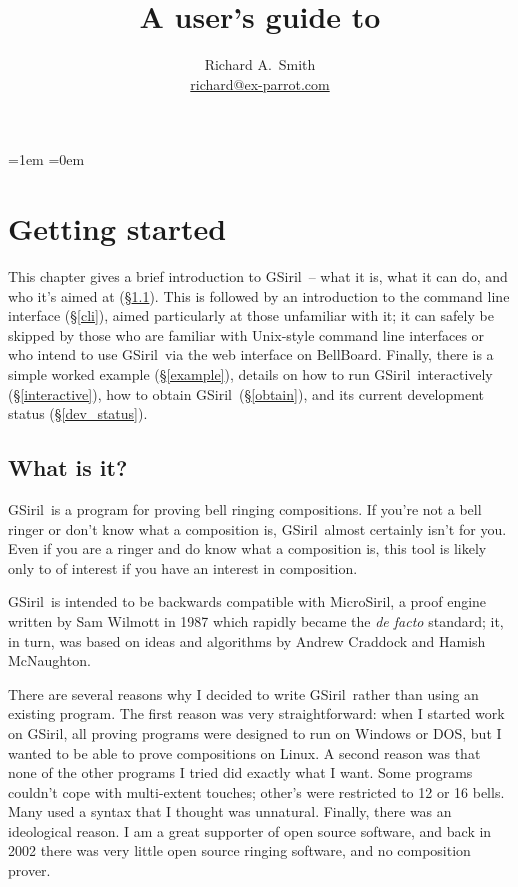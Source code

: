 \documentclass[a4paper,11pt,oneside]{book}
\title{A user's guide to \gsiril}
\author{Richard A.\ Smith\\\url{richard@ex-parrot.com}}
\def\gsiril{GSiril}
\newcommand{\sref}[1]{\hyperref[#1]{\S\ref{#1}}}
\begin{document}
\frontmatter
\maketitle

\clearpage
{}
{}
\tableofcontents
\parskip=1em
\parindent=0em
\addtolength{\footnotesep}{4pt}

\mainmatter

\chapter{Getting started}

This chapter gives a brief introduction to \gsiril\ -- what it is,
what it can do, and who it's aimed at (\sref{what_is_it}).  
This is followed by an introduction to the command line interface (\sref{cli}),
aimed particularly at those unfamiliar with it; it can safely be
skipped by those who are familiar with Unix-style command line interfaces 
or who intend to use \gsiril\ via the web interface on BellBoard.
Finally, there is a simple worked example (\sref{example}),
details on how to run \gsiril\ interactively (\sref{interactive}),
how to obtain \gsiril\ (\sref{obtain}), and its
current development status (\sref{dev_status}).


\section{What is it?}\label{what_is_it}

\gsiril\ is a program for proving bell ringing compositions. 
If you're not a bell ringer or don't know what a composition is, 
\gsiril\ almost certainly isn't for you.
Even if you are a ringer and do know what a composition is, this tool
is likely only to of interest if you have an interest in composition.

\gsiril\ is intended to be backwards compatible with
MicroSiril, a proof engine written by Sam
Wilmott in 1987 which rapidly became the
\textit{de facto} standard; it, in turn, was based on ideas and
algorithms by Andrew Craddock and Hamish
McNaughton. 

There are several reasons why I decided to write \gsiril\ rather than
using an existing program.  The first reason was very straightforward:
when I started work on \gsiril, all proving programs were designed to
run on Windows or DOS, but I wanted to be able to prove compositions on
Linux.  A second reason was that none of the other programs I tried did
exactly what I want.  Some programs couldn't cope with multi-extent
touches; other's were restricted to 12 or 16 bells.  Many used a syntax
that I thought was unnatural.  Finally, there was an ideological reason.
I am a great supporter of open source software, and back in 2002 there
was very little open source ringing software, and no composition prover.
\end{document}
